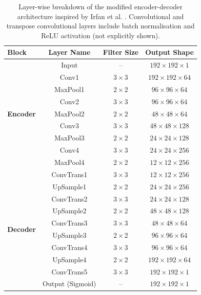 \begin{table}[htbp]
\centering
\caption{Layer-wise breakdown of the modified encoder-decoder architecture inspired by Irfan et al. \cite{brito-loeza_novel_2020}. Convolutional and transpose convolutional layers include batch normalisation and ReLU activation (not explicitly shown).}
\label{tab:irfan2020-model}
\renewcommand{\arraystretch}{1.25}
    \begin{tabular}{lccc}
    \toprule
    \textbf{Block} & \textbf{Layer Name} & \textbf{Filter Size} & \textbf{Output Shape} \\ 
    \midrule
    \multirow{9}{*}{\textbf{Encoder}}
        & Input        & --           & $192 \times 192 \times 1$ \\ 
        & Conv1        & $3 \times 3$ & $192 \times 192 \times 64$ \\ 
        & MaxPool1     & $2 \times 2$ & $96 \times 96 \times 64$ \\ 
        & Conv2        & $3 \times 3$ & $96 \times 96 \times 64$ \\ 
        & MaxPool2     & $2 \times 2$ & $48 \times 48 \times 64$ \\ 
        & Conv3        & $3 \times 3$ & $48 \times 48 \times 128$ \\ 
        & MaxPool3     & $2 \times 2$ & $24 \times 24 \times 128$ \\ 
        & Conv4        & $3 \times 3$ & $24 \times 24 \times 256$ \\ 
        & MaxPool4     & $2 \times 2$ & $12 \times 12 \times 256$ \\ 
    \midrule
    \multirow{11}{*}{\textbf{Decoder}}
        & ConvTrans1   & $3 \times 3$ & $12 \times 12 \times 256$ \\ 
        & UpSample1    & $2 \times 2$ & $24 \times 24 \times 256$ \\ 
        & ConvTrans2   & $3 \times 3$ & $24 \times 24 \times 128$ \\ 
        & UpSample2    & $2 \times 2$ & $48 \times 48 \times 128$ \\ 
        & ConvTrans3   & $3 \times 3$ & $48 \times 48 \times 64$ \\ 
        & UpSample3    & $2 \times 2$ & $96 \times 96 \times 64$ \\ 
        & ConvTrans4   & $3 \times 3$ & $96 \times 96 \times 64$ \\ 
        & UpSample4    & $2 \times 2$ & $192 \times 192 \times 64$ \\ 
        & ConvTrans5   & $3 \times 3$ & $192 \times 192 \times 1$ \\ 
        & Output (Sigmoid) & --           & $192 \times 192 \times 1$ \\ 
    \bottomrule
    \end{tabular}
\end{table}

